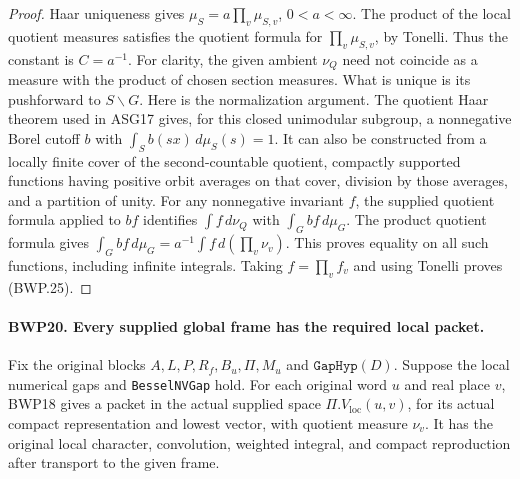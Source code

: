 \begin{proof}
Haar uniqueness gives \(\mu_S=a\prod_v\mu_{S,v}\),
\(0<a<\infty\).  The product of the local quotient measures
satisfies the quotient formula for \(\prod_v\mu_{S,v}\),
by Tonelli.  Thus the constant is \(C=a^{-1}\).
For clarity, the given ambient \(\nu_Q\) need not coincide
as a measure with the product of chosen section measures.
What is unique is its pushforward to \(S\backslash G\).
Here is the normalization argument.  The quotient Haar theorem
used in ASG17 gives, for this closed unimodular subgroup, a
nonnegative Borel cutoff \(b\) with
\(\int_S b(sx)\,d\mu_S(s)=1\).
It can also be constructed from a locally finite cover of the
second-countable quotient, compactly supported functions having
positive orbit averages on that cover, division by those averages,
and a partition of unity.  For any nonnegative invariant \(f\),
the supplied quotient formula applied to \(bf\) identifies
\(\int f\,d\nu_Q\) with \(\int_G bf\,d\mu_G\).
The product quotient formula gives
\(\int_G bf\,d\mu_G=a^{-1}\int f\,d(\prod_v\nu_v)\).
This proves equality on all such
functions, including infinite integrals.  Taking \(f=\prod_v f_v\)
and using Tonelli proves (BWP.25).
\end{proof}

\paragraph{BWP20. Every supplied global frame has the required local packet.}
\label{claim:BWP20}
Fix the original blocks \(A,L,P,R_f,B_u,\Pi,M_u\) and
\(\texttt{GapHyp}(D)\).  Suppose the local numerical gaps and
\texttt{BesselNVGap} hold.  For each original word \(u\) and
real place \(v\), BWP18 gives a packet in the actual supplied
space \(\Pi.V_{\mathrm{loc}}(u,v)\), for its actual compact
representation and lowest vector, with quotient measure \(\nu_v\).
It has the original local character, convolution, weighted integral,
and compact reproduction after transport to the given frame.

